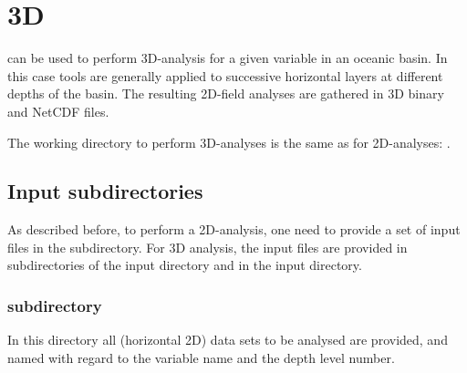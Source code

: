 \chapter{\diva 3D\label{chap:diva3D}}

\diva  can be used to perform 3D-analysis  for a given variable in an oceanic basin. In this case \diva tools are generally applied to successive horizontal layers at different depths of the basin. The resulting 2D-field analyses are gathered in 3D binary and NetCDF files.

The working directory to perform 3D-analyses is the same as for 2D-analyses: \linebreak {}.


\minitoc

\section{Input subdirectories}

As described before, to perform a 2D-analysis, one need to provide a set of input files in the   subdirectory. For 3D analysis, the input files are provided in subdirectories of the input directory and in the input directory.

\subsection[DIVA3D/divastripped/input/divadata subdirectory]{ subdirectory}

In this directory all (horizontal 2D) data sets to be analysed are provided, and named with regard to the variable name and the depth level  number.


\begin{center}
\end{center}

